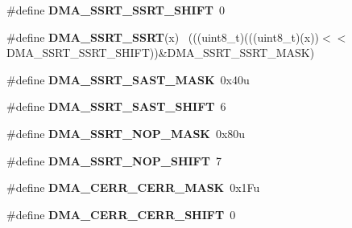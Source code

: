 \begin{DoxyCompactItemize}
\item 
\hypertarget{group___d_m_a___register___masks_gacdadd55124a59d83a6b26976e85fb0ff}{}\#define {\bfseries D\+M\+A\+\_\+\+S\+S\+R\+T\+\_\+\+S\+S\+R\+T\+\_\+\+S\+H\+I\+F\+T}~0\label{group___d_m_a___register___masks_gacdadd55124a59d83a6b26976e85fb0ff}

\item 
\hypertarget{group___d_m_a___register___masks_ga2512da5542cb63c495b52ad917e917a8}{}\#define {\bfseries D\+M\+A\+\_\+\+S\+S\+R\+T\+\_\+\+S\+S\+R\+T}(x)                                              ~(((uint8\+\_\+t)(((uint8\+\_\+t)(x))$<$$<$D\+M\+A\+\_\+\+S\+S\+R\+T\+\_\+\+S\+S\+R\+T\+\_\+\+S\+H\+I\+F\+T))\&D\+M\+A\+\_\+\+S\+S\+R\+T\+\_\+\+S\+S\+R\+T\+\_\+\+M\+A\+S\+K)\label{group___d_m_a___register___masks_ga2512da5542cb63c495b52ad917e917a8}

\item 
\hypertarget{group___d_m_a___register___masks_gadcecaad6474bd238180952527a63130b}{}\#define {\bfseries D\+M\+A\+\_\+\+S\+S\+R\+T\+\_\+\+S\+A\+S\+T\+\_\+\+M\+A\+S\+K}~0x40u\label{group___d_m_a___register___masks_gadcecaad6474bd238180952527a63130b}

\item 
\hypertarget{group___d_m_a___register___masks_gac7f4ffa288a04ba1361b240caf7188d7}{}\#define {\bfseries D\+M\+A\+\_\+\+S\+S\+R\+T\+\_\+\+S\+A\+S\+T\+\_\+\+S\+H\+I\+F\+T}~6\label{group___d_m_a___register___masks_gac7f4ffa288a04ba1361b240caf7188d7}

\item 
\hypertarget{group___d_m_a___register___masks_gad515a6cb794fc947138fac918dedd068}{}\#define {\bfseries D\+M\+A\+\_\+\+S\+S\+R\+T\+\_\+\+N\+O\+P\+\_\+\+M\+A\+S\+K}~0x80u\label{group___d_m_a___register___masks_gad515a6cb794fc947138fac918dedd068}

\item 
\hypertarget{group___d_m_a___register___masks_ga0c698d2dc363fc0487cccc5dfbd4fed5}{}\#define {\bfseries D\+M\+A\+\_\+\+S\+S\+R\+T\+\_\+\+N\+O\+P\+\_\+\+S\+H\+I\+F\+T}~7\label{group___d_m_a___register___masks_ga0c698d2dc363fc0487cccc5dfbd4fed5}

\item 
\hypertarget{group___d_m_a___register___masks_ga291fce290f4fce77f31d4f210781a5cc}{}\#define {\bfseries D\+M\+A\+\_\+\+C\+E\+R\+R\+\_\+\+C\+E\+R\+R\+\_\+\+M\+A\+S\+K}~0x1\+Fu\label{group___d_m_a___register___masks_ga291fce290f4fce77f31d4f210781a5cc}

\item 
\hypertarget{group___d_m_a___register___masks_ga3aed793831e2681ef8989bbe67ffaa17}{}\#define {\bfseries D\+M\+A\+\_\+\+C\+E\+R\+R\+\_\+\+C\+E\+R\+R\+\_\+\+S\+H\+I\+F\+T}~0\label{group___d_m_a___register___masks_ga3aed793831e2681ef8989bbe67ffaa17}


\end{DoxyCompactItemize}

